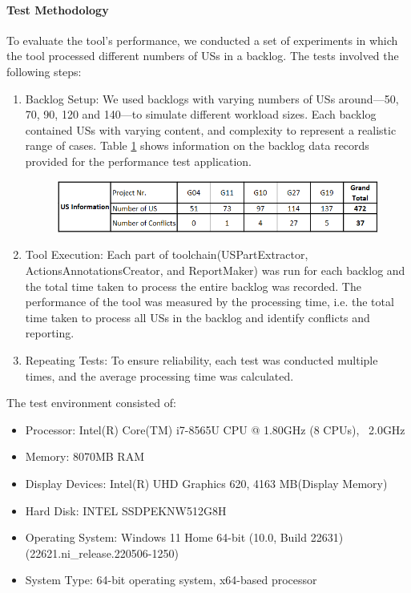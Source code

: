 \paragraph{Test Methodology}To evaluate the tool's performance, we conducted a set of experiments in which the tool processed different numbers of USs in a backlog. The tests involved the following steps:
\begin{enumerate}
	\item Backlog Setup: We used backlogs with varying numbers of USs around—50, 70, 90, 120 and 140—to simulate different workload sizes. Each backlog contained USs with varying content, and complexity to represent a realistic range of cases. Table \ref{tb:conflict_performance_env} shows information on the backlog data records provided for the performance test application.
	\begin{figure}[h]
		\begingroup
		\scriptsize
		\centering
		\includegraphics[scale=0.7]{Table/conflict_performance_env.png}
		\label{tb:conflict_performance_env}
		\endgroup
	\end{figure}
	\item Tool Execution: Each part of toolchain(USPartExtractor, ActionsAnnotationsCreator, and ReportMaker) was run for each backlog and the total time taken to process the entire backlog was recorded. The performance of the tool was measured by the processing time, i.e. the total time taken to process all USs in the backlog and identify conflicts and reporting.
	
	\item Repeating Tests: To ensure reliability, each test was conducted multiple times, and the average processing time was calculated.
\end{enumerate}
The test environment consisted of:
\begin{itemize}
	\item Processor: Intel(R) Core(TM) i7-8565U CPU @ 1.80GHz (8 CPUs), ~2.0GHz		
	\item Memory: 8070MB RAM
	\item Display Devices: Intel(R) UHD Graphics 620, 4163 MB(Display Memory)
	\item Hard Disk: INTEL SSDPEKNW512G8H
	\item Operating System: Windows 11 Home 64-bit (10.0, Build 22631) (22621.ni\_release.220506-1250)
	\item System Type: 64-bit operating system, x64-based processor
\end{itemize}
